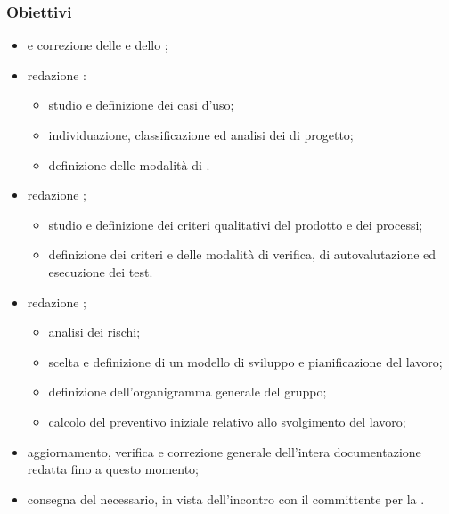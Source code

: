         \subsubsection{Obiettivi}
            \begin{itemize}
                \item {} e correzione delle \NdP{} e dello \SdF{};
                \item redazione \AdR{}:
                \begin{itemize}
                    \item studio e definizione dei casi d'uso;
                    \item individuazione, classificazione ed analisi dei  di progetto;
                    \item definizione delle modalità di .
                \end{itemize}
                \item redazione \PdQ{};
                \begin{itemize}
                    \item studio e definizione dei criteri qualitativi del prodotto e dei processi;
                    \item definizione dei criteri e delle modalità di verifica, di autovalutazione ed esecuzione dei test.
                \end{itemize}
                \item redazione \PdP{};
                \begin{itemize}
                    \item analisi dei rischi;
                    \item scelta e definizione di un modello di sviluppo e pianificazione del lavoro;
                    \item definizione dell'organigramma generale del gruppo;
                    \item calcolo del preventivo iniziale relativo allo svolgimento del lavoro;
                \end{itemize}
                \item aggiornamento, verifica e correzione generale dell'intera documentazione redatta fino a questo momento;
                \item consegna del  necessario, in vista dell'incontro con il committente per la \RR{}.
            \end{itemize}